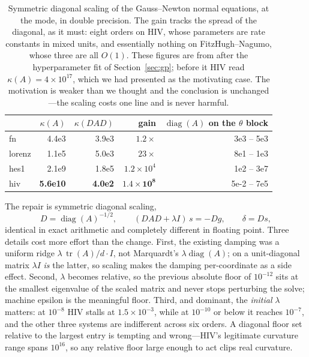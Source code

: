 \documentclass[11pt]{article}
\newcommand{\tr}{\operatorname{tr}}
\theoremstyle{plain}
\theoremstyle{definition}
\theoremstyle{remark}
\begin{document}
\begin{table}[t]
\centering\small
\begin{tabular}{lrrrr}
\toprule
& $\kappa(A)$ & $\kappa(DAD)$ & gain & $\operatorname{diag}(A)$ on the $\theta$ block\\
\midrule
fn     & 4.4e3 & 3.9e3 & $1.2\times$ & 3e3 -- 5e3\\
lorenz & 1.1e5 & 5.0e3 & $23\times$ & 8e1 -- 1e3\\
hes1   & 2.1e9 & 1.8e5 & $1.2\times10^{4}$ & 1e2 -- 3e7\\
hiv    & \textbf{5.6e10} & \textbf{4.0e2} & $\mathbf{1.4\times10^{8}}$ & 5e-2 -- 7e5\\
\bottomrule
\end{tabular}
\caption{Symmetric diagonal scaling of the Gauss--Newton normal equations, at the mode, in double
precision. The gain tracks the spread of the diagonal, as it must: eight orders on HIV, whose
parameters are rate constants in mixed units, and essentially nothing on FitzHugh--Nagumo, whose
three are all $O(1)$. These figures are from after the hyperparameter fit of
Section~\ref{sec:gp}; before it HIV read $\kappa(A) = 4\times10^{17}$, which we had presented as
the motivating case. The motivation is weaker than we thought and the conclusion is unchanged---the
scaling costs one line and is never harmful.}
\label{tab:cond}
\end{table}

The repair is symmetric diagonal scaling,
\begin{equation}
\label{eq:jacobi}
  D = \operatorname{diag}(A)^{-1/2},\qquad (DAD + \lambda I)\,s = -Dg,\qquad \delta = Ds,
\end{equation}
identical in exact arithmetic and completely different in floating point. Three details cost more
effort than the change. First, the existing damping was a uniform ridge
$\lambda\,\tr(A)/d\cdot I$, not Marquardt's $\lambda\operatorname{diag}(A)$; on a unit-diagonal
matrix $\lambda I$ \emph{is} the latter, so scaling makes the damping per-coordinate as a side
effect. Second, $\lambda$ becomes relative, so the previous absolute floor of $10^{-12}$ sits at
the smallest eigenvalue of the scaled matrix and never stops perturbing the solve; machine epsilon
is the meaningful floor. Third, and dominant, the \emph{initial} $\lambda$ matters: at $10^{-8}$
HIV stalls at $1.5\times10^{-3}$, while at $10^{-10}$ or below it reaches $10^{-7}$, and the other
three systems are indifferent across six orders. A diagonal floor set relative to the largest entry
is tempting and wrong---HIV's legitimate curvature range spans $10^{16}$, so any relative floor
large enough to act clips real curvature.
\end{document}
